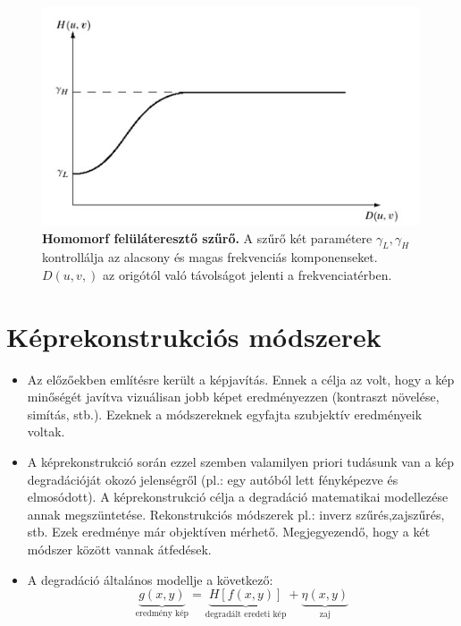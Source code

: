 \documentclass[12pt]{article}
\theoremstyle{plain}
\begin{document}
\begin{itemize}
\begin{figure}[H]
    \begin{center}
    \includegraphics[width=0.75\linewidth]{media/gauss.png}
    \caption{\textbf{Homomorf felüláteresztő szűrő.} A szűrő két paramétere $\gamma_L,\gamma_H$ kontrollálja az alacsony és magas frekvenciás komponenseket. $D(u,v,) $ az origótól való távolságot jelenti a frekvenciatérben.} 
    \label{fig:gauss}
    \end{center}
\end{figure}


\end{itemize}{}

\section{Képrekonstrukciós módszerek}

\begin{itemize}
    \item Az előzőekben említésre került a képjavítás. Ennek a célja az volt, hogy a kép minőségét javítva vizuálisan jobb képet eredményezzen (kontraszt növelése, simítás, stb.). Ezeknek a módszereknek egyfajta szubjektív eredményeik voltak.
    \item A képrekonstrukció során ezzel szemben valamilyen priori tudásunk van a kép degradációját okozó jelenségről (pl.: egy autóból lett fényképezve és elmosódott). A képrekonstrukció célja a degradáció matematikai modellezése annak megszüntetése. Rekonstrukciós módszerek pl.: inverz szűrés,zajszűrés, stb. Ezek eredménye már objektíven mérhető. Megjegyezendő, hogy a két módszer között vannak átfedések.
    \item A degradáció általános modellje a következő:
    $$\underbrace{g(x,y)}_{\text{eredmény kép}} = \underbrace{H[f(x,y)]}_{\text{degradált eredeti kép}} + \underbrace{\eta(x,y)}_{\text{zaj}}$$
\end{itemize}{}
\end{document}
